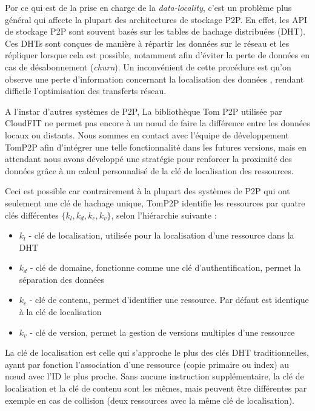 Por ce qui est de la prise en charge de la \textit{data-locality}, c'est un problème plus général qui affecte la plupart des architectures de stockage P2P. En effet, les API de stockage P2P sont souvent basés sur les tables de hachage distribuées (DHT). Ces DHTs sont conçues de manière à répartir les données sur le réseau et les répliquer lorsque cela est possible, notamment afin d'éviter la perte de données en cas de désabonnement (\textit{churn}). Un inconvénient de cette procédure est qu'on observe une perte d'information concernant la localisation des données \cite{Wu2005}, rendant difficile l'optimisation des transferts réseau. 

A l'instar d'autres systèmes de P2P, La bibliothèque Tom P2P utilisée par CloudFIT ne permet pas encore à un n\oe{}ud de faire la différence entre les données locaux ou distants. Nous sommes en contact avec l'équipe de développement TomP2P afin d'intégrer une telle fonctionnalité dans les futures versions, mais en attendant nous avons développé une stratégie pour renforcer la proximité des données grâce à un calcul personnalisé de la clé de localisation des ressources. 

Ceci est possible car contrairement à la plupart des systèmes de P2P qui ont seulement une clé de hachage unique, TomP2P identifie les ressources par quatre clés différentes $\{k_l,k_d,k_c,k_v\}$, selon l'hiérarchie suivante : 
\begin{itemize}
	\item \textit{$k_l$} - clé de localisation, utilisée pour la localisation d'une ressource dans la DHT
	\item \textit{$k_d$} - clé de domaine, fonctionne comme une clé d'authentification, permet la séparation des données
	\item \textit{$k_c$} - clé de contenu, permet d'identifier une ressource. Par défaut est identique à la clé de localisation 
	\item \textit{$k_v$} - clé de version, permet la gestion de versions multiples d'une ressource
\end{itemize} 

La clé de localisation est celle qui s'approche le plus des clés DHT traditionnelles, ayant par fonction l'association d'une ressource (copie primaire ou index) au n\oe{}ud avec l'ID le plus proche. Sans aucune instruction supplémentaire, la clé de localisation et la clé de contenu sont les mêmes, mais peuvent être différentes par exemple en cas de collision (deux ressources avec la même clé de localisation).

